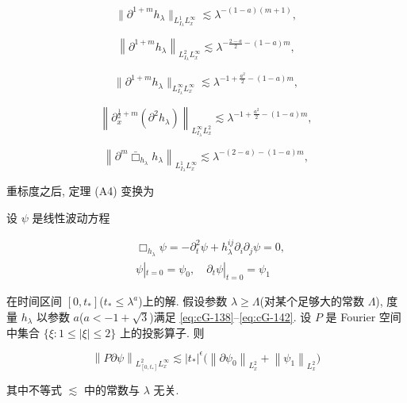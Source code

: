 \begin{equation}
\|\partial^{1 + m}h_{\lambda}\|_{L_{I_{\lambda}}^{1}L_{x}^{\infty}} \lesssim \lambda^{-(1 - a)(m + 1)}, \label{eq:cG-138}
\end{equation}

\begin{equation}
\left\|\partial^{1 + m}h_{\lambda}\right\|_{L_{I_{\lambda}}^{2}L_{x}^{\infty}} \lesssim \lambda^{-\frac{2 - a}{2} - (1 - a)m}, \label{eq:cG-139}
\end{equation}

\begin{equation}
\|\partial^{1 + m}h_{\lambda}\|_{L_{I_{\lambda}}^{\infty}L_{x}^{\infty}} \lesssim \lambda^{-1 + \frac{a^{2}}{2} - (1 - a)m}, \label{eq:cG-140}
\end{equation}

\begin{equation}
\left\|\partial_{x}^{\frac{1}{2} + m}\left(\partial^{2}h_{\lambda}\right)\right\|_{L_{I_{\lambda}}^{\infty}L_{x}^{2}} \lesssim \lambda^{-1 + \frac{a^{2}}{2} - (1 - a)m}, \label{eq:cG-141}
\end{equation}

\begin{equation}
\left\|\partial^{m}\bar{\Box}_{h_{\lambda}}h_{\lambda}\right\|_{L_{I_{\lambda}}^{1}L_{x}^{\infty}} \lesssim \lambda^{-(2 - a) - (1 - a)m}, \label{eq:cG-142}
\end{equation}

重标度之后, 定理 (A4) 变换为

\begin{theorem}[A5]\label{thm:cG-6.17}
设 $\psi$ 是线性波动方程

\begin{equation}
\begin{aligned}
&\Box_{h_{\lambda}}\psi = -\partial_{t}^{2}\psi + h_{\lambda}^{ij}\partial_{i}\partial_{j}\psi = 0,  \\
&\psi|_{t = 0} = \psi_{0},  \quad \partial_{t}\psi|_{t = 0} = \psi_{1}
\end{aligned}\label{eq:cG-143}
\end{equation}

在时间区间 $[0,  t_{*}]$($t_{*} \leq \lambda^{a}$)上的解. 假设参数 $\lambda \geq \Lambda$(对某个足够大的常数 $\Lambda$), 度量 $h_{\lambda}$ 以参数 $a$($a < -1 + \sqrt{3}$)满足 \eqref{eq:cG-138}--\eqref{eq:cG-142}. 设 $P$ 是 Fourier 空间中集合 $\{\xi : 1 \leq |\xi| \leq 2\}$ 上的投影算子. 则

\begin{equation}
\left\|P\partial\psi\right\|_{L_{[0,  t_{*}]}^{2}L_{x}^{\infty}} \lesssim |t_{*}|^{\epsilon}\big(\left\|\partial\psi_{0}\right\|_{L_{x}^{2}} + \left\|\psi_{1}\right\|_{L_{x}^{2}}\big)\label{eq:cG-144}
\end{equation}

其中不等式 $\lesssim$ 中的常数与 $\lambda$ 无关. 
\end{theorem}

